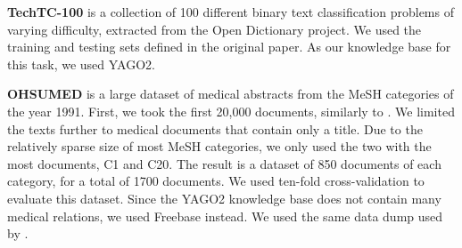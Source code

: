 \documentclass[letterpaper]{article} %
\theoremstyle{definition}
\begin{document}
\textbf{TechTC-100} \cite{gabrilovich2004text} is a collection of 100 different binary text classification problems of varying difficulty, extracted from the Open Dictionary project.
We used the training and testing sets defined in the original paper. 
As our knowledge base for this task, we used YAGO2.%




\textbf{OHSUMED} \cite{hersh1994ohsumed} is a large dataset of medical abstracts from the MeSH categories of the year 1991. 
First, we took the first 20,000 documents, similarly to \citeauthor{joachims1998text} .
We limited the texts further to medical documents that contain only a title. %
Due to the relatively sparse size of most MeSH categories, we only used the two with the most documents, C1 and C20. %
The result is a dataset of 850 documents of each category, for a total of 1700 documents.
We used ten-fold cross-validation to evaluate this dataset.
Since the YAGO2 knowledge base does not contain many medical relations, we used Freebase instead. We used the same data dump used by \citeauthor{bast2014easy} . 
\end{document}
